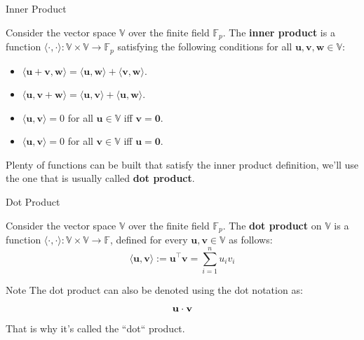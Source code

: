 \documentclass{beamer}
\begin{document}
    \begin{frame}{Inner Product}
        \begin{definition}
            Consider the vector space $\mathbb{V}$ over the finite field $\mathbb{F}_p$. The 
            \textbf{inner product} is a function 
            $\langle \cdot, \cdot \rangle: \mathbb{V} \times \mathbb{V} \to \mathbb{F}_p$ satisfying 
            the following conditions for all $\mathbf{u},\mathbf{v},\mathbf{w} \in \mathbb{V}$:
            \begin{itemize}
                \item $\langle \mathbf{u} + \mathbf{v}, \mathbf{w} \rangle = \langle \mathbf{u}, \mathbf{w} \rangle + \langle \mathbf{v}, \mathbf{w} \rangle$.
                \item $\langle \mathbf{u}, \mathbf{v} + \mathbf{w} \rangle = \langle \mathbf{u}, \mathbf{v} \rangle + \langle \mathbf{u}, \mathbf{w} \rangle$.
                \item $\langle \mathbf{u}, \mathbf{v} \rangle = 0$ for all $\mathbf{u} \in \mathbb{V}$ iff $\mathbf{v} = \mathbf{0}$.
                \item $\langle \mathbf{u}, \mathbf{v} \rangle = 0$ for all $\mathbf{v} \in \mathbb{V}$ iff $\mathbf{u} = \mathbf{0}$.
            \end{itemize}
        \end{definition}   

        Plenty of functions can be built that satisfy the inner product definition, we'll use the one
        that is usually called \textbf{dot product}.
    \end{frame}

    \begin{frame}{Dot Product}
        \begin{definition}
            Consider the vector space $\mathbb{V}$ over the finite field $\mathbb{F}_p$. The 
            \textbf{dot product} on $\mathbb{V}$ is a function 
            $\langle \cdot, \cdot \rangle: \mathbb{V} \times \mathbb{V} \rightarrow \mathbb{F}$, 
            defined for every $\mathbf{u}, \mathbf{v} \in \mathbb{V}$ as follows:
            \begin{equation*}
                \langle \mathbf{u}, \mathbf{v} \rangle := \mathbf{u}^{\top}\mathbf{v} = \sum_{i=1}^{n} u_i v_i
            \end{equation*}
        \end{definition}

        \pause
        \begin{block}{Note}                 
            The dot product can also be denoted using the dot notation as:
            \vspace{-8pt}
            \begin{equation*}
                \mathbf{u} \cdot \mathbf{v}
                \vspace{-8pt}
            \end{equation*}
            That is why it's called the ``dot`` product.
        \end{block}
    \end{frame}
\end{document}
